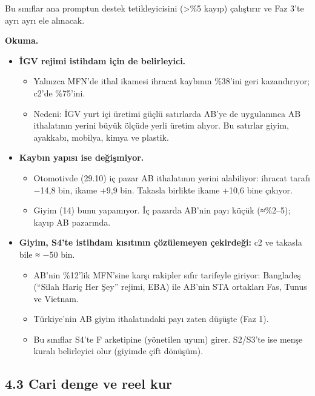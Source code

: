 Bu sınıflar ana promptun destek tetikleyicisini (\textgreater\%5 kayıp) çalıştırır ve Faz 3'te ayrı ayrı ele alınacak.

\textbf{Okuma.}

\begin{itemize}
\tightlist
\item
  \textbf{İGV rejimi istihdam için de belirleyici.}

  \begin{itemize}
  \tightlist
  \item
    Yalnızca MFN'de ithal ikamesi ihracat kaybının \%38'ini geri kazandırıyor; c2'de \%75'ini.
  \item
    Nedeni: İGV yurt içi üretimi güçlü satırlarda AB'ye de uygulanınca AB ithalatının yerini büyük ölçüde yerli üretim alıyor. Bu satırlar giyim, ayakkabı, mobilya, kimya ve plastik.
  \end{itemize}
\item
  \textbf{Kaybın yapısı ise değişmiyor.}

  \begin{itemize}
  \tightlist
  \item
    Otomotivde (29.10) iç pazar AB ithalatının yerini alabiliyor: ihracat tarafı −14,8 bin, ikame +9,9 bin. Takasla birlikte ikame +10,6 bine çıkıyor.
  \item
    Giyim (14) bunu yapamıyor. İç pazarda AB'nin payı küçük (≈\%2--5); kayıp AB pazarında.
  \end{itemize}
\item
  \textbf{Giyim, S4'te istihdam kısıtının çözülemeyen çekirdeği:} c2 ve takasla bile ≈ −50 bin.

  \begin{itemize}
  \tightlist
  \item
    AB'nin \%12'lik MFN'sine karşı rakipler sıfır tarifeyle giriyor: Bangladeş (``Silah Hariç Her Şey'' rejimi, EBA) ile AB'nin STA ortakları Fas, Tunus ve Vietnam.
  \item
    Türkiye'nin AB giyim ithalatındaki payı zaten düşüşte (Faz 1).
  \item
    Bu sınıflar S4'te F arketipine (yönetilen uyum) girer. S2/S3'te ise menşe kuralı belirleyici olur (giyimde çift dönüşüm).
  \end{itemize}
\end{itemize}

\hypertarget{02a_politika_uzayi-43-cari-denge-ve-reel-kur}{%
\subsection{4.3 Cari denge ve reel kur}\label{02a_politika_uzayi-43-cari-denge-ve-reel-kur}}

